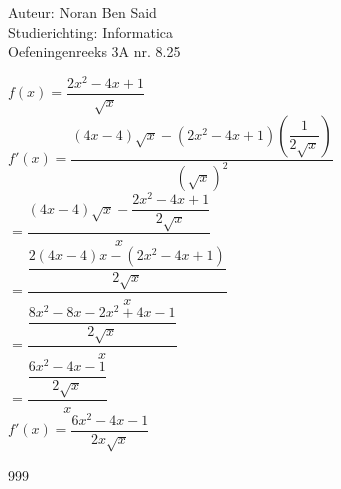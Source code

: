 \documentclass[a4paper]{article}
\begin{document}
  
\noindent \large Auteur: Noran Ben Said \\
\noindent \large Studierichting: Informatica\\
\noindent \large Oefeningenreeks 3A nr. 8.25\\

\medskip

\normalsize

$f(x) = \dfrac{2x^2 - 4x +1}{\sqrt{x}}$\\



$ f'(x) = \dfrac{(4x - 4)\sqrt{x} - (2x^2 - 4x + 1)\left(\dfrac{1}{2\sqrt{x}}\right)}{(\sqrt{x})^2} $\\

$ = \dfrac{(4x - 4)\sqrt{x} - \dfrac{2x^2 - 4x + 1}{2\sqrt{x}}}{x} $\\

$ = \dfrac{\dfrac{2(4x - 4)x - (2x^2 - 4x + 1)}{2\sqrt{x}}}{x}$\\

$ = \dfrac{\dfrac{8x^2 - 8x - 2x^2 + 4x - 1}{2\sqrt{x}}}{x} $\\

$ = \dfrac{\dfrac{6x^2 - 4x - 1}{2\sqrt{x}}}{x} $\\

$ f'(x) = \dfrac{6x^2 - 4x - 1}{2x\sqrt{x}} $\\

\begin{thebibliography}{999}
\end{thebibliography}
\end{document}
